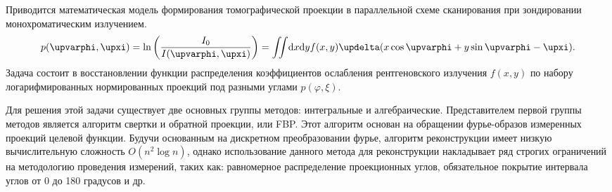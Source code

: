 Приводится математическая модель формирования томографической проекции в параллельной схеме сканирования при зондировании монохроматическим излучением. 
\begin{equation}\notag
  p(\varphi, \xi) = \ln \left (\frac{I_0}{I(\varphi, \xi)} \right) = 
 \iint \! \mathrm d x \mathrm d y f(x,y)\delta(x\cos\varphi + y\sin\varphi - \xi).
\end{equation}
Задача состоит в восстановлении функции распределения коэффициентов ослабления рентгеновского излучения $f(x,y)$ по набору логарифмированных нормированных проекций под разными углами $p(\varphi, \xi)$.

Для решения этой задачи существует две основных группы методов: интегральные и алгебраические.
Представителем первой группы методов является алгоритм свертки и обратной проекции, или FBP. 
Этот алгоритм основан на обращении фурье-образов измеренных проекций целевой функции.
Будучи основанным на дискретном преобразовании фурье, алгоритм реконструкции имеет низкую вычислительную сложность $O(n^2 \log n)$, однако %
использование данного метода для реконструкции накладывает ряд строгих ограничений на методологию проведения измерений, таких как: равномерное распределение проекционных углов, обязательное покрытие интервала углов от 0 до 180 градусов и др. 

